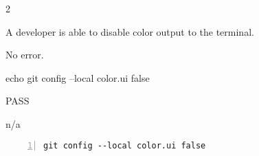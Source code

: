 \begin{description}[align=right,leftmargin=3.2cm,labelindent=3.0cm]
\item[Step:] 2
\item[Confirm:] A developer is able to disable color output to the terminal.
\item[Expectation:] No error.
\item[Command:] echo git  config --local color.ui false
\item[Test Result:] PASS
\item[Evidence:] n/a
\end{description}
\begin{lstlisting}[numbers=left]
git config --local color.ui false

\end{lstlisting}
